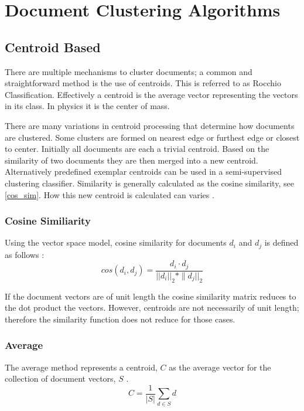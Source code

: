 \documentclass[11pt,twocolumn]{article}
\begin{document}
\section{Document Clustering Algorithms}
\subsection{Centroid Based}
There are multiple mechanisms to cluster documents; a common and straightforward method is the use of centroids.  This is referred to as Rocchio Classification.  Effectively a centroid is the average vector representing the vectors in its class.  In physics it is the center of mass.

There are many variations in centroid processing that determine how documents are clustered.  Some clusters are formed on nearest edge or furthest edge or closest to center.  Initially all documents are each a trivial centroid.  Based on the similarity of two documents they are then merged into a new centroid.  Alternatively predefined exemplar centroids can be used in a semi-supervised clustering classifier.  Similarity is generally calculated as the cosine similarity, see \ref{cos_sim}.  How this new centroid is calculated can varies \cite{Mann2008}.

\subsubsection{Cosine Similiarity}
Using the vector space model, cosine similarity for documents $d_i$ and $d_j$ is defined as follows \cite{Geo2000}:
\begin{equation}
\label{cos_sim}
cos(d_i, d_j) = \frac{d_i \cdot d_j}{||d_i||_2 \ast \parallel d_j||_2}
\end{equation}

If the document vectors are of unit length the cosine similarity matrix reduces to the dot product the vectors.  However, centroids are not necessarily of unit length; therefore the similarity function does not reduce for those cases.

\subsubsection{Average}
The average method represents a centroid, $C$ as the average vector for the collection of document vectors, $S$ \cite{Car2007}.
\begin{equation*}
C = \frac{1}{|S|}\sum_{d \in S} d
\end{equation*}
\end{document}
